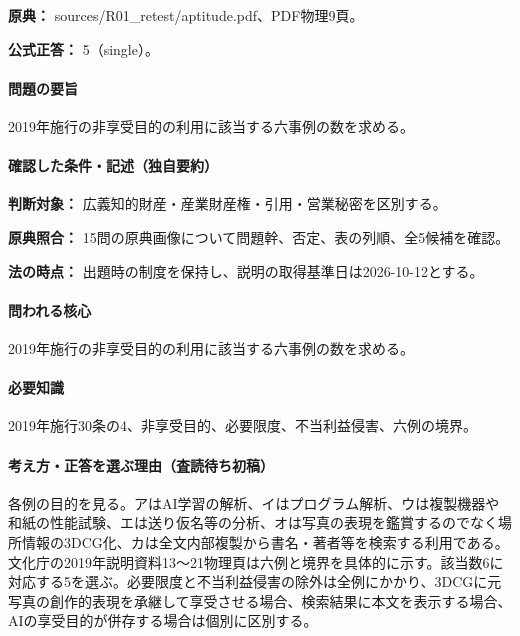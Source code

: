 \noindent\textbf{原典：} sources/R01\_retest/aptitude.pdf、PDF物理9頁。

\textbf{公式正答：} 5（single）。

\paragraph{問題の要旨} 2019年施行の非享受目的の利用に該当する六事例の数を求める。

\paragraph{確認した条件・記述（独自要約）}\mbox{}\par

\noindent\textbf{判断対象：} 広義知的財産・産業財産権・引用・営業秘密を区別する。\par

\noindent\textbf{原典照合：} 15問の原典画像について問題幹、否定、表の列順、全5候補を確認。\par

\noindent\textbf{法の時点：} 出題時の制度を保持し、説明の取得基準日は2026-10-12とする。\par

\paragraph{問われる核心} 2019年施行の非享受目的の利用に該当する六事例の数を求める。

\paragraph{必要知識} 2019年施行30条の4、非享受目的、必要限度、不当利益侵害、六例の境界。

\paragraph{考え方・正答を選ぶ理由（査読待ち初稿）} 各例の目的を見る。アはAI学習の解析、イはプログラム解析、ウは複製機器や和紙の性能試験、エは送り仮名等の分析、オは写真の表現を鑑賞するのでなく場所情報の3DCG化、カは全文内部複製から書名・著者等を検索する利用である。文化庁の2019年説明資料13〜21物理頁は六例と境界を具体的に示す。該当数6に対応する5を選ぶ。必要限度と不当利益侵害の除外は全例にかかり、3DCGに元写真の創作的表現を承継して享受させる場合、検索結果に本文を表示する場合、AIの享受目的が併存する場合は個別に区別する。

